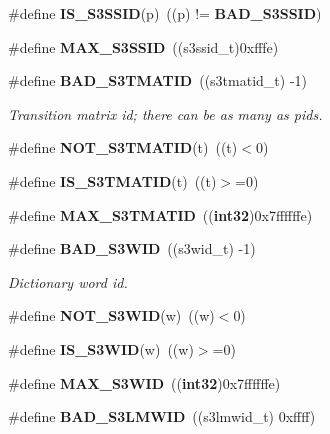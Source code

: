 \begin{DoxyCompactItemize}
\item 
\#define {\bfseries \-I\-S\-\_\-\-S3\-S\-S\-I\-D}(p)~((p) != {\bf \-B\-A\-D\-\_\-\-S3\-S\-S\-I\-D})\label{s3types_8h_ac533a32014a94120efdce25e72250d29}

\item 
\#define {\bfseries \-M\-A\-X\-\_\-\-S3\-S\-S\-I\-D}~((s3ssid\-\_\-t)0xfffe)\label{s3types_8h_a2117753e26a16eb54e65bf9eb1e7da71}

\item 
\#define {\bf \-B\-A\-D\-\_\-\-S3\-T\-M\-A\-T\-I\-D}~((s3tmatid\-\_\-t) -\/1)\label{s3types_8h_a0ffaad3d41b251f6fa9b3bf100c65e43}

\begin{DoxyCompactList}\small\item\em \-Transition matrix id; there can be as many as pids. \end{DoxyCompactList}\item 
\#define {\bfseries \-N\-O\-T\-\_\-\-S3\-T\-M\-A\-T\-I\-D}(t)~((t)$<$0)\label{s3types_8h_ab264bfd7015d51a198493bfdb865f048}

\item 
\#define {\bfseries \-I\-S\-\_\-\-S3\-T\-M\-A\-T\-I\-D}(t)~((t)$>$=0)\label{s3types_8h_a20077ac868a70e926afc38da292cc2dd}

\item 
\#define {\bfseries \-M\-A\-X\-\_\-\-S3\-T\-M\-A\-T\-I\-D}~(({\bf int32})0x7ffffffe)\label{s3types_8h_ad2cb6136cfcdf796b0d9898dca87d78b}

\item 
\#define {\bf \-B\-A\-D\-\_\-\-S3\-W\-I\-D}~((s3wid\-\_\-t) -\/1)\label{s3types_8h_a5c42410b7125da611210c5a4be29898b}

\begin{DoxyCompactList}\small\item\em \-Dictionary word id. \end{DoxyCompactList}\item 
\#define {\bfseries \-N\-O\-T\-\_\-\-S3\-W\-I\-D}(w)~((w)$<$0)\label{s3types_8h_a7b364438f577cb6720a626f4e5f9f8a9}

\item 
\#define {\bfseries \-I\-S\-\_\-\-S3\-W\-I\-D}(w)~((w)$>$=0)\label{s3types_8h_a07f5b75772f56f3de78e139e69c2daf9}

\item 
\#define {\bfseries \-M\-A\-X\-\_\-\-S3\-W\-I\-D}~(({\bf int32})0x7ffffffe)\label{s3types_8h_a7ceb7a1c017e804d3ffdb49085fb8e3f}

\item 
\#define {\bf \-B\-A\-D\-\_\-\-S3\-L\-M\-W\-I\-D}~((s3lmwid\-\_\-t) 0xffff)\label{s3types_8h_a8b6ebbb3ea347c20d1bbc991086ce875}


\end{DoxyCompactItemize}
